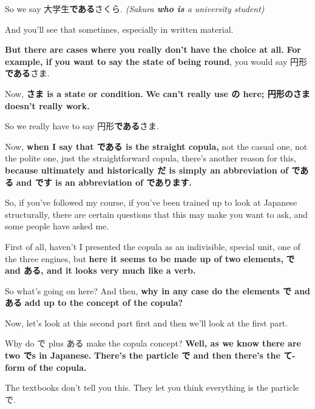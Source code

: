 \thinrule

So we say 大学生{\bf である}さくら. {\em (Sakura {\bf who is} a university student)}

And you'll see that sometimes, especially in written material.

\thinrule

{\bf But there are cases where you really don't have the choice at all.} {\bf For example, if you want to say the state of being round}, you would say 円形{\bf である}さま.

{}

Now, {\bf さま is a state or condition.} {\bf We can't really use の here; 円形のさま doesn't really work.}

So we really have to say 円形{\bf である}さま.

Now, {\bf when I say that である is the straight copula,} not the casual one, not the polite one, just the straightforward copula, there's another reason for this, {\bf because ultimately and historically だ is simply an abbreviation of である} {\bf and です is an abbreviation of であります.}

{}

So, if you've followed my course, if you've been trained up to look at Japanese structurally, there are certain questions that this may make you want to ask, and some people have asked me.

First of all, haven't I presented the copula as an indivisible, special unit, one of the three engines, but {\bf here it seems to be made up of two elements,} {\bf で and ある, and it looks very much like a verb.}

So what's going on here? And then, {\bf why in any case do the elements で and ある} {\bf add up to the concept of the copula?}

\startsectionlevel[title={Why で & ある add up to make copula},reference={why-で-ある-add-up-to-make-copula}]

Now, let's look at this second part first and then we'll look at the first part.

Why do で plus ある make the copula concept? {\bf Well, as we know there are two でs in Japanese.} {\bf There's the particle で and then there's the て-form of the copula.}

{}

The textbooks don't tell you this. They let you think everything is the particle で.

